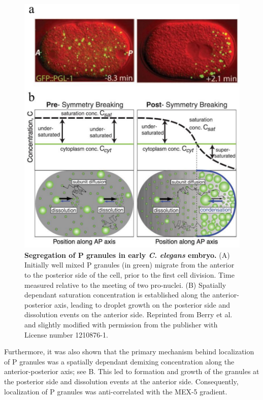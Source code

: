 \begin{figure}[tb]
\centering
\includegraphics[scale=0.5]{MainContent/BioFigures/gradient.pdf}
\caption{\textbf{Segregation of P granules in early \textit{C. elegans} embryo.}
(A) Initially well mixed P granules (in green) migrate from the anterior to the posterior side of the cell, prior to the first cell division.
Time measured relative to the meeting of two pro-nuclei.
(B) Spatially dependant saturation concentration is established along the anterior-posterior axis, leading to droplet growth on the posterior side and dissolution events on the anterior side. 
Reprinted from Berry et al. \cite{Berry2018} and slightly modified with permission from the publisher with License number 1210876-1.
}
\label{fig:gradient_change}
\end{figure}

Furthermore, it was also shown that the primary mechanism behind localization of P granules was a spatially dependant demixing concentration along the anterior-posterior axis; see B.
This led to formation and growth of the granules at the posterior side and dissolution events at the anterior side.
Consequently, localization of P granules was anti-correlated with the MEX-5 gradient.

